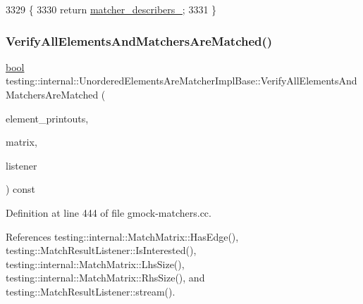 \begin{DoxyCode}
3329                                             \{
3330     \textcolor{keywordflow}{return} \hyperlink{classtesting_1_1internal_1_1UnorderedElementsAreMatcherImplBase_af416e45f53ebdfe4bccd710142db1600}{matcher\_describers\_};
3331   \}
\end{DoxyCode}
\mbox{\label{classtesting_1_1internal_1_1UnorderedElementsAreMatcherImplBase_a515ec900bd84fe4d28e3ccf55db25822}} 
\subsubsection{\texorpdfstring{Verify\+All\+Elements\+And\+Matchers\+Are\+Matched()}{VerifyAllElementsAndMatchersAreMatched()}}
{\footnotesize\ttfamily \hyperlink{classbool}{bool} testing\+::internal\+::\+Unordered\+Elements\+Are\+Matcher\+Impl\+Base\+::\+Verify\+All\+Elements\+And\+Matchers\+Are\+Matched (\begin{DoxyParamCaption}\item[{const \+::std\+::vector$<$ \hyperlink{namespacetesting_1_1internal_a8e8ff5b11e64078831112677156cb111}{string} $>$ \&}]{element\+\_\+printouts,  }\item[{const \hyperlink{classtesting_1_1internal_1_1MatchMatrix}{Match\+Matrix} \&}]{matrix,  }\item[{\hyperlink{classtesting_1_1MatchResultListener}{Match\+Result\+Listener} $\ast$}]{listener }\end{DoxyParamCaption}) const\hspace{0.3cm}{\ttfamily [protected]}}



Definition at line 444 of file gmock-\/matchers.\+cc.



References testing\+::internal\+::\+Match\+Matrix\+::\+Has\+Edge(), testing\+::\+Match\+Result\+Listener\+::\+Is\+Interested(), testing\+::internal\+::\+Match\+Matrix\+::\+Lhs\+Size(), testing\+::internal\+::\+Match\+Matrix\+::\+Rhs\+Size(), and testing\+::\+Match\+Result\+Listener\+::stream().



